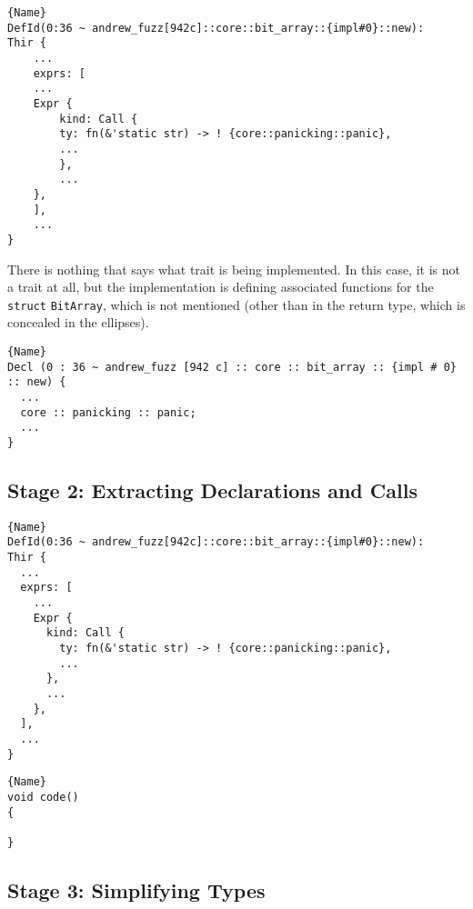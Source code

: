 \documentclass[11pt]{article}
\begin{document}
\begin{lstlisting}[caption=THIR-flat, label=code:all_calls]{Name}
DefId(0:36 ~ andrew_fuzz[942c]::core::bit_array::{impl#0}::new):
Thir {
    ...
    exprs: [
    ...
    Expr {
        kind: Call {
        ty: fn(&'static str) -> ! {core::panicking::panic},
        ...
        },
        ...
    },
    ],
    ...
}
\end{lstlisting}

There is nothing that says what trait is being implemented.
In this case, it is not a trait at all, but the implementation is defining associated functions for the \lstinline{struct} \lstinline{BitArray}, which is not mentioned (other than in the return type, which is concealed in the ellipses).

\begin{lstlisting}[caption=Extracted Calls, label=code:all_calls]{Name}
Decl (0 : 36 ~ andrew_fuzz [942 c] :: core :: bit_array :: {impl # 0} :: new) {
  ...
  core :: panicking :: panic;
  ...
}
\end{lstlisting}

\subsection{Stage 2: Extracting Declarations and Calls}

\noindent\begin{minipage}{.45\textwidth}
    \begin{lstlisting}[caption=Before Simplifying Types, label=before_simplify_types]{Name}
DefId(0:36 ~ andrew_fuzz[942c]::core::bit_array::{impl#0}::new):
Thir {
  ...
  exprs: [
    ...
    Expr {
      kind: Call {
        ty: fn(&'static str) -> ! {core::panicking::panic},
        ...
      },
      ...
    },
  ],
  ...
}
    \end{lstlisting}
\end{minipage}\hfill
\begin{minipage}{.45\textwidth}
    \begin{lstlisting}[caption=After Simplifying Types, label=after_simplifying_types]{Name}
void code()
{

}
    \end{lstlisting}
\end{minipage}

\subsection{Stage 3: Simplifying Types}
\end{document}
